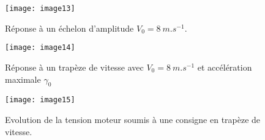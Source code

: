 \begin{figure}[!h]
\centering
\texttt{[image: image13]}
\caption{\label{fig:CCMP:2021:13} Réponse à un échelon d’amplitude $V_0=\SI{8}{m.s^{-1}}$.}
\end{figure} 
 
\begin{figure}[!h]
\centering
\texttt{[image: image14]}
\caption{\label{fig:CCMP:2021:14} Réponse à un trapèze de vitesse avec $V_0=\SI{8}{m.s^{-1}}$ et accélération maximale $\gamma_0$}
\end{figure} 

\begin{figure}[!h]
\centering
\texttt{[image: image15]}
\caption{\label{fig:CCMP:2021:15} Evolution de la tension moteur soumis à une consigne en trapèze de vitesse.}
\end{figure} 


\ifprof
\begin{corrige}
\end{corrige}
\else
\fi

